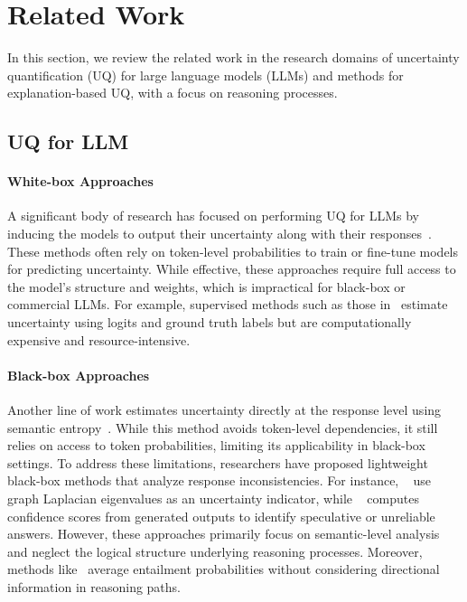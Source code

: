 \section{Related Work}

In this section, we review the related work in the research domains of uncertainty quantification (UQ) for large language models (LLMs) and methods for explanation-based UQ, with a focus on reasoning processes.



\subsection{UQ for LLM}

\paragraph{White-box Approaches} A significant body of research has focused on performing UQ for LLMs by inducing the models to output their uncertainty along with their responses~\cite{kadavath2022language, lin2022teaching, mielke2020linguistic, tian2023just}. These methods often rely on token-level probabilities to train or fine-tune models for predicting uncertainty. While effective, these approaches require full access to the model's structure and weights, which is impractical for black-box or commercial LLMs. For example, supervised methods such as those in~\cite{kadavath2022language} estimate uncertainty using logits and ground truth labels but are computationally expensive and resource-intensive.
\paragraph{Black-box Approaches} Another line of work estimates uncertainty directly at the response level using semantic entropy~\cite{kuhn2023semantic}. While this method avoids token-level dependencies, it still relies on access to token probabilities, limiting its applicability in black-box settings. To address these limitations, researchers have proposed lightweight black-box methods that analyze response inconsistencies. For instance, ~\citet{lin2023generating} use graph Laplacian eigenvalues as an uncertainty indicator, while ~\citet{chen2023quantifying} computes confidence scores from generated outputs to identify speculative or unreliable answers. However, these approaches primarily focus on semantic-level analysis and neglect the logical structure underlying reasoning processes. Moreover, methods like~\cite{lin2023generating} average entailment probabilities without considering directional information in reasoning paths.

